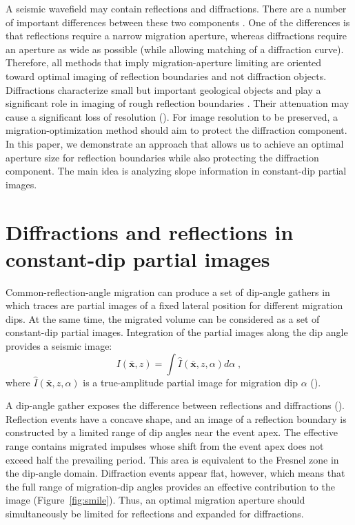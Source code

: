 A seismic wavefield may contain reflections and diffractions. There are a number of important 
differences between these two components \cite[]{klem-musatov94}.
One of the differences is that reflections require a narrow migration aperture, whereas diffractions require an aperture as
wide as possible (while allowing matching of a diffraction curve).
Therefore, all methods that imply migration-aperture limiting are oriented
toward optimal imaging of reflection boundaries and not diffraction objects. Diffractions characterize small but important geological
objects and play a significant role in imaging of rough reflection boundaries \cite[]{khaidukov04}.
Their attenuation may cause a significant loss of resolution (\citealp[]{neidell97}). For image resolution to be preserved,
a migration-optimization method should aim to protect the diffraction component. In this paper, we demonstrate an approach
that allows us to achieve an optimal aperture size for reflection boundaries while also protecting the diffraction component.
The main idea is analyzing slope information in constant-dip partial images.

\section{Diffractions and reflections in constant-dip partial images}

Common-reflection-angle migration \cite[]{xu01} can produce a set of 
dip-angle gathers in which traces are partial images of a fixed lateral position for different migration dips.
At the same time, the migrated volume can be considered as a set of constant-dip partial images. Integration of the 
partial images along the dip angle provides a seismic image:
\begin{equation}
\label{eq:imaging}
I(\mathbf{\bar{x}},z)=\int\limits\hat{I}(\mathbf{\bar{x}},z,\alpha)d\alpha\;,
\end{equation}
where $\hat{I}(\mathbf{\bar{x}},z,\alpha)$ is a true-amplitude partial image for migration dip $\alpha$ (\citealp[]{bleistein2002}).

A dip-angle gather exposes the difference between reflections and diffractions (\citealp[]{audebert02,landa08,klokov12}). 
Reflection events have a concave shape, and an image of a reflection boundary is constructed by a limited range of dip
angles near the event apex. The effective range contains migrated impulses whose shift from the event apex does not 
exceed half the prevailing period. This area is equivalent to the Fresnel zone in the dip-angle domain.
Diffraction events appear flat, however, which means that the full range of migration-dip angles provides
an effective contribution to the image (Figure~\ref{fig:smile}). Thus, an optimal migration aperture should simultaneously be limited for reflections
and expanded for diffractions.


